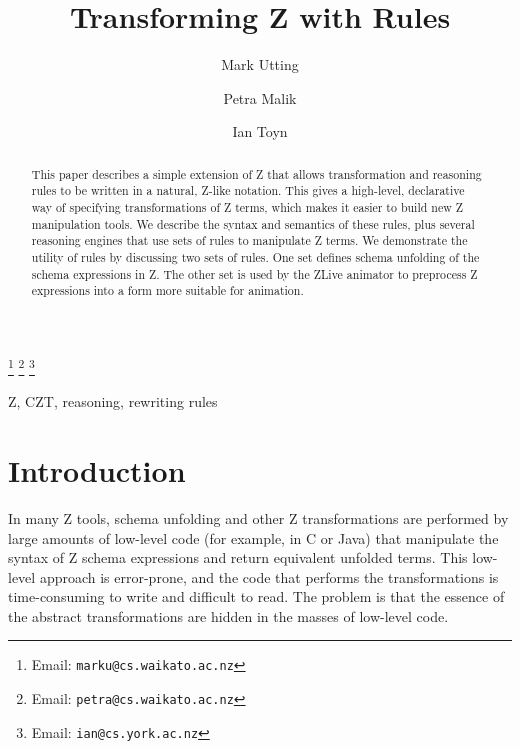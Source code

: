 \documentclass{entcs}
\begin{document}
\begin{frontmatter}
  \title{Transforming Z with Rules}
  \author{Mark Utting}
  \address{Department of Computer Science\\
    The University of Waikato\\
    Hamilton, New Zealand} 
  \author{Petra Malik}
  \address{Department of Computer Science\\
    The University of Waikato\\
    Hamilton, New Zealand} 
  \author{Ian Toyn}
  \address{Department of Computer Science\\
    The University of York\\
    Heslington, York, UK}
  \thanks[emailMark]{Email: \texttt{marku@cs.waikato.ac.nz}}
  \thanks[emailPetra]{Email: \texttt{petra@cs.waikato.ac.nz}}
  \thanks[emailIan]{Email: \texttt{ian@cs.york.ac.nz}}
\begin{abstract}
  This paper describes a simple extension of Z that allows transformation
  and reasoning rules to be written in a natural, Z-like notation.  This
  gives a high-level, declarative way of specifying transformations of Z
  terms, which makes it easier to build new Z manipulation tools.
  We describe the syntax and semantics of these rules, plus several reasoning
  engines that use sets of rules to manipulate Z terms.  We demonstrate the
  utility of rules by discussing two sets of rules.  One set defines schema
  unfolding of the schema expressions in Z.  The other set is used by
  the ZLive animator to preprocess Z expressions into a form more suitable
  for animation.  
\end{abstract}
\begin{keyword}
  Z, CZT, reasoning, rewriting rules
\end{keyword}
\end{frontmatter}



\section{Introduction}

In many Z tools, schema unfolding and other Z transformations are performed
by large amounts of low-level code (for example, in C or Java) that
manipulate the syntax of Z schema expressions and return equivalent
unfolded terms.  This low-level approach is error-prone, and the code that
performs the transformations is time-consuming to write and difficult to
read.  The problem is that the essence of the abstract transformations are
hidden in the masses of low-level code.
\end{document}
